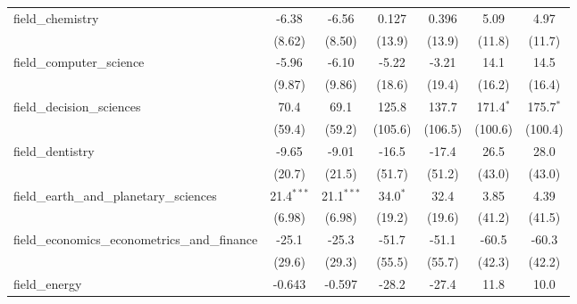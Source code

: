 \begin{tabular}{lcccccc}
   field\_chemistry                                            & -6.38          & -6.56          & 0.127          & 0.396          & 5.09          & 4.97\\   
                                                               & (8.62)         & (8.50)         & (13.9)         & (13.9)         & (11.8)        & (11.7)\\   
   field\_computer\_science                                    & -5.96          & -6.10          & -5.22          & -3.21          & 14.1          & 14.5\\   
                                                               & (9.87)         & (9.86)         & (18.6)         & (19.4)         & (16.2)        & (16.4)\\   
   field\_decision\_sciences                                   & 70.4           & 69.1           & 125.8          & 137.7          & 171.4$^{*}$   & 175.7$^{*}$\\   
                                                               & (59.4)         & (59.2)         & (105.6)        & (106.5)        & (100.6)       & (100.4)\\   
   field\_dentistry                                            & -9.65          & -9.01          & -16.5          & -17.4          & 26.5          & 28.0\\   
                                                               & (20.7)         & (21.5)         & (51.7)         & (51.2)         & (43.0)        & (43.0)\\   
   field\_earth\_and\_planetary\_sciences                      & 21.4$^{***}$   & 21.1$^{***}$   & 34.0$^{*}$     & 32.4           & 3.85          & 4.39\\   
                                                               & (6.98)         & (6.98)         & (19.2)         & (19.6)         & (41.2)        & (41.5)\\   
   field\_economics\_econometrics\_and\_finance                & -25.1          & -25.3          & -51.7          & -51.1          & -60.5         & -60.3\\   
                                                               & (29.6)         & (29.3)         & (55.5)         & (55.7)         & (42.3)        & (42.2)\\   
   field\_energy                                               & -0.643         & -0.597         & -28.2          & -27.4          & 11.8          & 10.0\\   

\end{tabular}
